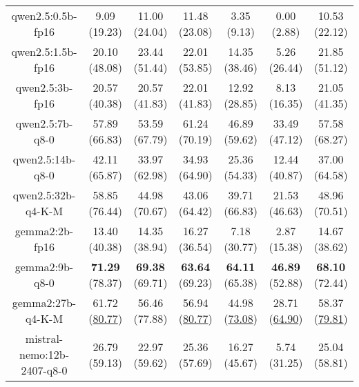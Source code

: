 \begin{table}[hbp]
{\begin{tabular}{ccccccc}
      \multicolumn{1}{c|}{qwen2.5:0.5b-fp16} & 9.09 (19.23) & 11.00 (24.04) & \multicolumn{1}{c|}{11.48 (23.08)} & 3.35 (9.13) & \multicolumn{1}{c|}{0.00 (2.88)} & 10.53 (22.12) \\

      \multicolumn{1}{c|}{qwen2.5:1.5b-fp16} & 20.10 (48.08) & 23.44 (51.44) & \multicolumn{1}{c|}{22.01 (53.85)} & 14.35 (38.46) & \multicolumn{1}{c|}{5.26 (26.44)} & 21.85 (51.12) \\

      \multicolumn{1}{c|}{qwen2.5:3b-fp16} & 20.57 (40.38) & 20.57 (41.83) & \multicolumn{1}{c|}{22.01 (41.83)} & 12.92 (28.85) & \multicolumn{1}{c|}{8.13 (16.35)} & 21.05 (41.35) \\

      \multicolumn{1}{c|}{qwen2.5:7b-q8-0} & 57.89 (66.83) & 53.59 (67.79) & \multicolumn{1}{c|}{61.24 (70.19)} & 46.89 (59.62) & \multicolumn{1}{c|}{33.49 (47.12)} & 57.58 (68.27) \\

      \multicolumn{1}{c|}{qwen2.5:14b-q8-0} & 42.11 (65.87) & 33.97 (62.98) & \multicolumn{1}{c|}{34.93 (64.90)} & 25.36 (54.33) & \multicolumn{1}{c|}{12.44 (40.87)} & 37.00 (64.58) \\

      \multicolumn{1}{c|}{qwen2.5:32b-q4-K-M} & 58.85 (76.44) & 44.98 (70.67) & \multicolumn{1}{c|}{43.06 (64.42)} & 39.71 (66.83) & \multicolumn{1}{c|}{21.53 (46.63)} & 48.96 (70.51) \\

      \multicolumn{1}{c|}{gemma2:2b-fp16} & 13.40 (40.38) & 14.35 (38.94) & \multicolumn{1}{c|}{16.27 (36.54)} & 7.18 (30.77) & \multicolumn{1}{c|}{2.87 (15.38)} & 14.67 (38.62) \\

      \multicolumn{1}{c|}{gemma2:9b-q8-0} & \textbf{71.29} (78.37) & \textbf{69.38} (69.71) & \multicolumn{1}{c|}{\textbf{63.64} (69.23)} & \textbf{64.11} (65.38) & \multicolumn{1}{c|}{\textbf{46.89} (52.88)} & \textbf{68.10} (72.44) \\

      \multicolumn{1}{c|}{gemma2:27b-q4-K-M} & 61.72 (\underline{80.77}) & 56.46 (77.88) & \multicolumn{1}{c|}{56.94 (\underline{80.77})} & 44.98 (\underline{73.08}) & \multicolumn{1}{c|}{28.71 (\underline{64.90})} & 58.37 (\underline{79.81}) \\

      \multicolumn{1}{c|}{mistral-nemo:12b-2407-q8-0} & 26.79 (59.13) & 22.97 (59.62) & \multicolumn{1}{c|}{25.36 (57.69)} & 16.27 (45.67) & \multicolumn{1}{c|}{5.74 (31.25)} & 25.04 (58.81) \\


\end{tabular}}
\end{table}
